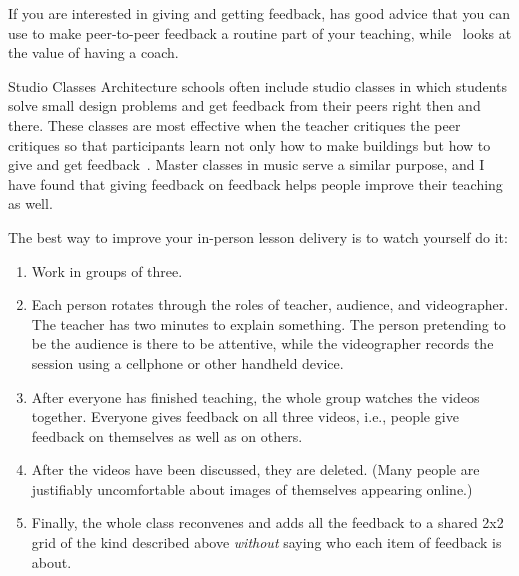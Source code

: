 
If you are interested in giving and getting feedback,
\cite{Gorm2014} has good advice
that you can use to make peer-to-peer feedback a routine part of your teaching,
while~\cite{Gawa2011} looks at the value of having a coach.

\begin{aside}{Studio Classes}
  Architecture schools often include studio classes
  in which students solve small design problems
  and get feedback from their peers right then and there.
  These classes are most effective when the teacher critiques the peer critiques
  so that participants learn not only how to make buildings
  but how to give and get feedback~\cite{Scho1984}.
  Master classes in music serve a similar purpose,
  and I have found that giving feedback on feedback
  helps people improve their teaching as well.
\end{aside}


The best way to improve your in-person lesson delivery
is to watch yourself do it:

\begin{enumerate}

\item
  Work in groups of three.

\item
  Each person rotates through the roles of teacher, audience, and videographer.
  The teacher has two minutes to explain something.
  The person pretending to be the audience is there to be attentive,
  while the videographer records the session using a cellphone or other handheld device.

\item
  After everyone has finished teaching,
  the whole group watches the videos together.
  Everyone gives feedback on all three videos,
  i.e., people give feedback on themselves as well as on others.

\item
  After the videos have been discussed,
  they are deleted.
  (Many people are justifiably uncomfortable about images of themselves appearing online.)

\item
  Finally,
  the whole class reconvenes
  and adds all the feedback to a shared 2x2 grid of the kind described above
  \emph{without} saying who each item of feedback is about.

\end{enumerate}

